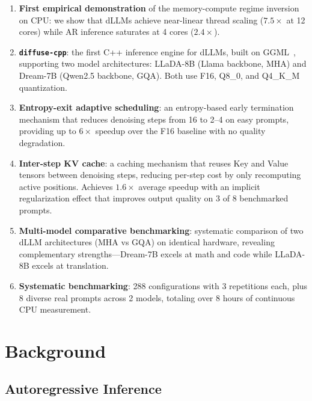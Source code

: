 \documentclass[11pt]{article}
\begin{document}
\begin{enumerate}
\item \textbf{First empirical demonstration} of the memory-compute regime inversion on
  CPU: we show that dLLMs achieve near-linear thread scaling ($7.5\times$ at 12 cores)
  while AR inference saturates at 4 cores ($2.4\times$).

\item \textbf{\texttt{diffuse-cpp}}: the first C++ inference engine for dLLMs, built on
  GGML~\cite{gerganov2023}, supporting two model architectures: LLaDA-8B
  (Llama backbone, MHA) and Dream-7B (Qwen2.5 backbone, GQA). Both use
  F16, Q8\_0, and Q4\_K\_M quantization.

\item \textbf{Entropy-exit adaptive scheduling}: an entropy-based early termination
  mechanism that reduces denoising steps from 16 to 2--4 on easy prompts, providing up
  to $6\times$ speedup over the F16 baseline with no quality degradation.

\item \textbf{Inter-step KV cache}: a caching mechanism that reuses Key and Value tensors
  between denoising steps, reducing per-step cost by only recomputing active positions.
  Achieves $1.6\times$ average speedup with an implicit regularization effect that
  improves output quality on 3 of 8 benchmarked prompts.

\item \textbf{Multi-model comparative benchmarking}: systematic comparison of two
  dLLM architectures (MHA vs GQA) on identical hardware, revealing complementary
  strengths---Dream-7B excels at math and code while LLaDA-8B excels at translation.

\item \textbf{Systematic benchmarking}: 288 configurations with 3 repetitions each,
  plus 8 diverse real prompts across 2 models, totaling over 8 hours of continuous
  CPU measurement.
\end{enumerate}


\section{Background}

\subsection{Autoregressive Inference}
\end{document}
